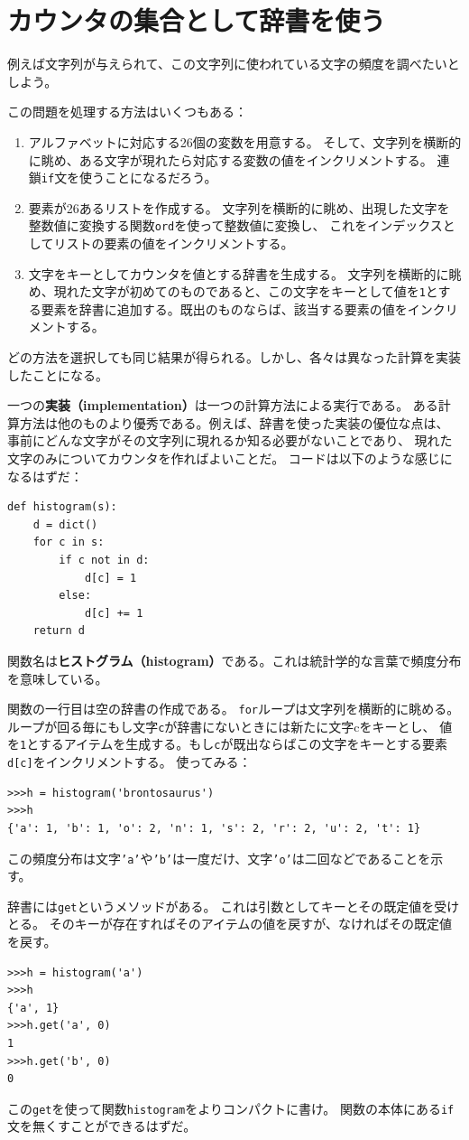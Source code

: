 \documentclass[a4j,12pt,makeidx]{jbook}
\begin{document}
\section{カウンタの集合として辞書を使う}
例えば文字列が与えられて、この文字列に使われている文字の頻度を調べたいとしよう。\par
この問題を処理する方法はいくつもある：
\begin{enumerate}
\item アルファベットに対応する26個の変数を用意する。
そして、文字列を横断的に眺め、ある文字が現れたら対応する変数の値をインクリメントする。
連鎖{\tt if}文を使うことになるだろう。
\item 要素が26あるリストを作成する。
文字列を横断的に眺め、出現した文字を整数値に変換する関数{\tt ord}を使って整数値に変換し、
これをインデックスとしてリストの要素の値をインクリメントする。
\item 文字をキーとしてカウンタを値とする辞書を生成する。
文字列を横断的に眺め、現れた文字が初めてのものであると、この文字をキーとして値を{\tt 1}とする要素を辞書に追加する。既出のものならば、該当する要素の値をインクリメントする。
\end{enumerate}
どの方法を選択しても同じ結果が得られる。しかし、各々は異なった計算を実装したことになる。 \par
一つの{\bf 実装（implementation）}は一つの計算方法による実行である。
ある計算方法は他のものより優秀である。例えば、辞書を使った実装の優位な点は、
事前にどんな文字がその文字列に現れるか知る必要がないことであり、
現れた文字のみについてカウンタを作ればよいことだ。
コードは以下のような感じになるはずだ：
\begin{verbatim}
def histogram(s):
    d = dict()
    for c in s:
        if c not in d:
            d[c] = 1
        else:
            d[c] += 1
    return d
\end{verbatim}
関数名は{\bf ヒストグラム（histogram）}である。これは統計学的な言葉で頻度分布を意味している。\par
関数の一行目は空の辞書の作成である。
{\tt for}ループは文字列を横断的に眺める。
ループが回る毎にもし文字{\tt c}が辞書にないときには新たに文字cをキーとし、
値を{\tt 1}とするアイテムを生成する。もし{\tt c}が既出ならばこの文字をキーとする要素{\tt d[c]}をインクリメントする。
使ってみる：
\begin{verbatim}
>>>h = histogram('brontosaurus')
>>>h
{'a': 1, 'b': 1, 'o': 2, 'n': 1, 's': 2, 'r': 2, 'u': 2, 't': 1}
\end{verbatim}
この頻度分布は文字{\tt 'a'}や{\tt 'b'}は一度だけ、文字{\tt 'o'}は二回などであることを示す。 \par
辞書には{\tt get}というメソッドがある。
これは引数としてキーとその既定値を受けとる。
そのキーが存在すればそのアイテムの値を戻すが、なければその既定値を戻す。
\begin{verbatim}
>>>h = histogram('a')
>>>h
{'a', 1}
>>>h.get('a', 0)
1
>>>h.get('b', 0)
0
\end{verbatim}
この{\tt get}を使って関数{\tt histogram}をよりコンパクトに書け。
関数の本体にある{\tt if}文を無くすことができるはずだ。
%
\end{document}
